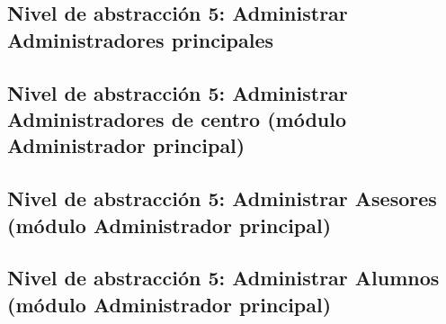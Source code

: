 \subsection{Nivel de abstracción 5: Administrar Administradores principales}



\subsection{Nivel de abstracción 5: Administrar Administradores de centro (\-mó\-dulo Administrador principal)}



\subsection{Nivel de abstracción 5: Administrar Asesores (módulo Administrador principal)}



\subsection{Nivel de abstracción 5: Administrar Alumnos (módulo Administrador principal)}


